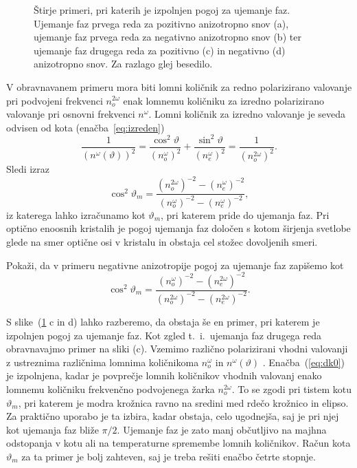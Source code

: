 \begin{figure}[h]
\centering
\def\svgwidth{140truemm} 

\caption{Štirje primeri, pri katerih je izpolnjen pogoj za ujemanje faz. 
Ujemanje faz prvega reda za pozitivno anizotropno snov (a), 
ujemanje faz prvega reda za negativno anizotropno snov (b) ter 
ujemanje faz drugega reda za pozitivno (c) in negativno (d) anizotropno snov.
Za razlago glej besedilo.}
\label{fig:dk}
\end{figure}

V obravnavanem primeru mora biti lomni količnik za redno polarizirano valovanje pri 
podvojeni frekvenci $n_o^{2\omega}$ enak lomnemu količniku za izredno 
polarizirano valovanje pri osnovni frekvenci $n^\omega$. Lomni količnik
za izredno valovanje je seveda odvisen od kota (enačba~\ref{eq:izreden})
\begin{equation}
\frac{1}{(n^{\omega}(\vartheta))^2}=
\frac{\cos^{2}\vartheta}{(n_{o}^{\omega})^2}+\frac{\sin^{2}\vartheta}{(n_{e}^{\omega})^2}
=\frac{1}{(n_o^{2\omega})^2}.
\label{8.12}
\end{equation}
Sledi izraz
\begin{equation}
\cos^{2}\vartheta_m=\frac{(n_o^{2\omega})^{-2}-(n_{e}^{\omega})^{-2}}
{(n_{o}^{\omega})^{-2}-(n_{e}^{\omega})^{-2}},
\label{8.13}
\end{equation}
iz katerega lahko izračunamo kot $\vartheta_m$, pri katerem pride do ujemanja faz.
Pri optično enoosnih kristalih je pogoj ujemanja faz določen s kotom širjenja
svetlobe glede na smer optične osi v kristalu in obstaja cel stožec dovoljenih smeri.
\begin{definition}
Pokaži, da v primeru negativne anizotropije pogoj za ujemanje faz zapišemo kot
\begin{equation}
\cos^{2}\vartheta_m=\frac{(n_o^{\omega})^{-2}-(n_{e}^{2\omega})^{-2}}
{(n_{o}^{2\omega})^{-2}-(n_{e}^{2\omega})^{-2}}.
\label{8.13a}
\end{equation}
\end{definition}

S slike~(\ref{fig:dk} c in d) lahko razberemo, da obstaja še en primer, pri 
katerem je izpolnjen pogoj za ujemanje faz. Kot zgled t.\ i.\ ujemanja faz drugega reda
obravnavajmo primer na sliki (c).
Vzemimo različno polarizirani vhodni valovanji z ustreznima različnima lomnima
količnikoma $n_o^\omega$ in $n^\omega(\vartheta)$ . 
Enačba~(\ref{eq:dk0}) je izpolnjena, kadar je povprečje lomnih količnikov
vhodnih valovanj  enako lomnemu količniku frekvenčno podvojenega žarka $n_o^{2\omega}$. 
To se zgodi pri tistem kotu $\vartheta_m$, pri katerem je modra krožnica ravno na 
sredini med rdečo krožnico in elipso. Za praktično uporabo je ta izbira, kadar obstaja,
celo ugodnejša, saj je pri njej kot ujemanja faz bliže $\pi/2$. 
Ujemanje faz je zato manj občutljivo na majhna odstopanja v kotu ali na temperaturne
spremembe lomnih količnikov. Račun kota $\vartheta_m$ za ta primer je
bolj zahteven, saj je treba rešiti enačbo četrte stopnje.

